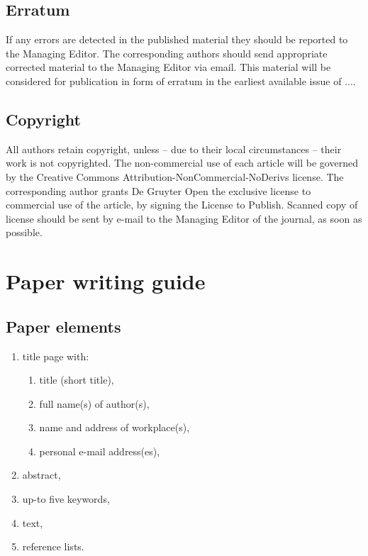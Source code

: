 \documentclass[USenglish,oneside,twocolumn]{article}
\begin{document}
\subsection{Erratum}

If any errors are detected in the published material they should be reported to the Managing Editor. The corresponding authors should send appropriate corrected material to the Managing Editor via email. This material will be considered for publication in form of erratum in the earliest available issue of ....

\subsection{Copyright  }

All authors retain copyright, unless -- due to their local circumstances -- their work is not copyrighted. The non-commercial use of each article will be governed by the Creative Commons Attribution-NonCommercial-NoDerivs license. The corresponding author grants De Gruyter Open the exclusive license to commercial use of the article, by signing the License to Publish. Scanned copy of license should be sent by e-mail to the Managing Editor of the journal, as soon as possible.


\section{Paper writing guide}

\subsection{Paper elements}

\begin{enumerate}
\item title page with:
    \begin{enumerate}
    \item title (short title),
    \item full name(s) of author(s),
    \item name and address of workplace(s),
    \item personal e-mail address(es),
    \end{enumerate}
\item abstract,
\item up-to five keywords,
\item text,
\item reference lists.
\end{enumerate}
\end{document}

